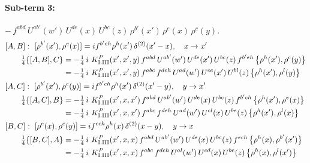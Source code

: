 \documentclass[10pt]{article}
\numberwithin{equation}{section}
\begin{document}
\paragraph{Sub-term 3:} $-\,f^{abd}\,U^{ab'}(w')\,U^{de}(x)\,U^{bc}(z)\,\rho^{b'}(x')\,\rho^{e}(x)\,\rho^{c}(y)$.
\begin{align}
&[A,B]:\ [\rho^{b'}(x'),\rho^{e}(x)]=i f^{b'eh}\rho^{h}(x')\,\delta^{(2)}(x'-x),\quad x\to x'\notag\\
&\qquad \tfrac14\{[A,B],C\}=-\tfrac14\,i\,\,K^{P}_{\rm I.III}(x',x',y)\,f^{abd}\,U^{ab'}(w')\,U^{de}(x')\,U^{bc}(z)\,f^{b'eh}\,\big\{\rho^{h}(x'),\rho^{c}(y)\big\}\notag\\
&\qquad\phantom{\tfrac14\{[A,B],C\}}=-\tfrac14\,i\,\,K^{P}_{\rm I.III}(x',x',y)\,f^{abc}\,f^{deh}\,U^{ad}(w')\,U^{ce}(x')\,U^{bl}(z)\,\big\{\rho^{h}(x'),\rho^{l}(y)\big\}
\label{eq:GI.III.P-3-AB}\\
&[A,C]:\ [\rho^{b'}(x'),\rho^{c}(y)]=i f^{b'ch}\rho^{h}(x')\,\delta^{(2)}(x'-y),\quad y\to x'\notag\\
&\qquad \tfrac14\{[A,C],B\}=-\tfrac14\,i\,\,K^{P}_{\rm I.III}(x',x,x')\,f^{abd}\,U^{ab'}(w')\,U^{de}(x)\,U^{bc}(z)\,f^{b'ch}\,\big\{\rho^{h}(x'),\rho^{e}(x)\big\}\notag\\
&\qquad\phantom{\tfrac14\{[A,C],B\}}=-\tfrac14\,i\,\,K^{P}_{\rm I.III}(x',x,x')\,f^{abc}\,f^{deh}\,U^{ad}(w')\,U^{cl}(x)\,U^{be}(z)\,\big\{\rho^{h}(x'),\rho^{l}(x)\big\}
\label{eq:GI.III.P-3-AC}\\
&[B,C]:\ [\rho^{e}(x),\rho^{c}(y)]=i f^{ech}\rho^{h}(x)\,\delta^{(2)}(x-y),\quad y\to x\notag\\
&\qquad \tfrac14\{[B,C],A\}=-\tfrac14\,i\,\,K^{P}_{\rm I.III}(x',x,x)\,f^{abd}\,U^{ab'}(w')\,U^{de}(x)\,U^{bc}(z)\,f^{ech}\,\big\{\rho^{h}(x),\rho^{b'}(x')\big\}\notag\\
&\qquad\phantom{\tfrac14\{[B,C],A\}}=-\tfrac14\,i\,\,K^{P}_{\rm I.III}(x',x,x)\,f^{abc}\,f^{deh}\,U^{al}(w')\,U^{cd}(x)\,U^{be}(z)\,\big\{\rho^{h}(x),\rho^{l}(x')\big\}
\label{eq:GI.III.P-3-BC}
\end{align}
\end{document}
